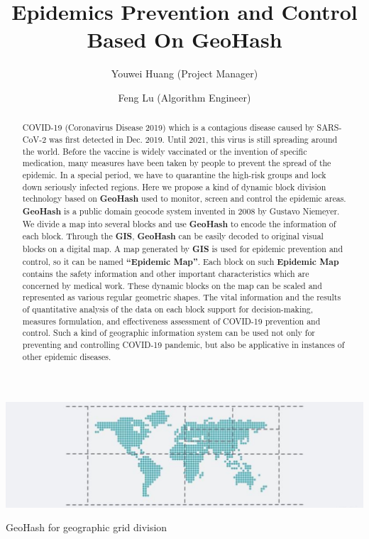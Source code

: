 \documentclass[sigplan,screen]{acmart}
\begin{document}
\title{Epidemics Prevention and Control Based On GeoHash}
\author{Youwei Huang (Project Manager)}
\author{Feng Lu (Algorithm Engineer)}
\begin{abstract}
	COVID-19 (Coronavirus Disease 2019) which is a contagious disease caused by SARS-CoV-2\cite{hu2020characteristics} was first detected in Dec. 2019.
	Until 2021, this virus is still spreading around the world.
	Before the vaccine is widely vaccinated or the invention of specific medication, many measures have been taken by people to prevent the spread of the epidemic.
	In a special period, we have to quarantine the high-risk groups and lock down seriously infected regions.
	Here we propose a kind of dynamic block division technology based on \textbf{GeoHash} used to monitor, screen and control the epidemic areas.
	\textbf{GeoHash} is a public domain geocode system invented in 2008 by Gustavo Niemeyer\cite{niemeyer2008geohash}.
	We divide a map into several blocks and use \textbf{GeoHash} to encode the information of each block.
	Through the \textbf{GIS}, \textbf{GeoHash} can be easily decoded to original visual blocks on a digital map.
	A map generated by \textbf{GIS} is used for epidemic prevention and control, so it can be named \textbf{``Epidemic Map''}.
	Each block on such \textbf{Epidemic Map} contains the safety information and other important characteristics which are concerned by medical work.
	These dynamic blocks on the map can be scaled and represented as various regular geometric shapes.
	The vital information and the results of quantitative analysis of the data on each block support for decision-making, measures formulation, and effectiveness assessment of COVID-19 prevention and control.
	Such a kind of geographic information system can be used not only for preventing and controlling COVID-19 pandemic, but also be applicative in instances of other epidemic diseases.
\end{abstract}
\begin{teaserfigure}
	\centering\includegraphics[width=\linewidth]{logo.png}
	\caption{GeoHash for geographic grid division}
	\label{fig:teaser}
\end{teaserfigure}
\end{document}
